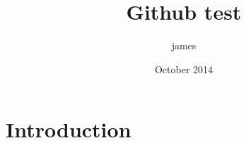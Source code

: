 \documentclass{article}
\title{Github test}
\author{james }
\date{October 2014}
\begin{document}
\maketitle

\section{Introduction}
\end{document}
